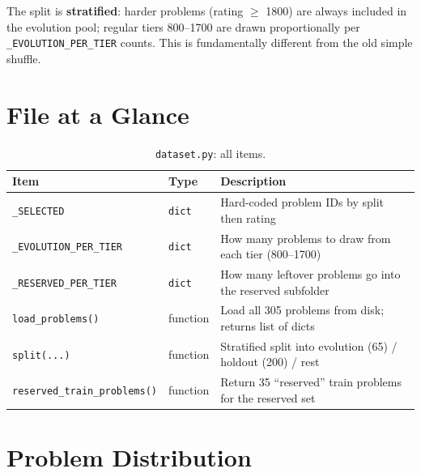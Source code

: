 \documentclass[11pt,a4paper]{report}
\newcommand{\pyfile}[1]{\texttt{#1}}
\newcommand{\fn}[1]{\texttt{#1}}
\begin{document}
The split is \textbf{stratified}: harder problems (rating $\geq$ 1800) are always included
in the evolution pool; regular tiers 800--1700 are drawn proportionally per
\fn{\_EVOLUTION\_PER\_TIER} counts.  This is fundamentally different from the old simple
shuffle.

\section{File at a Glance}

\begin{table}[h]
\centering
\begin{tabular}{@{}llp{7.5cm}@{}}
\toprule
\textbf{Item} & \textbf{Type} & \textbf{Description} \\
\midrule
\fn{\_SELECTED}              & \texttt{dict} & Hard-coded problem IDs by split then rating \\
\fn{\_EVOLUTION\_PER\_TIER}  & \texttt{dict} & How many problems to draw from each tier (800--1700) \\
\fn{\_RESERVED\_PER\_TIER}   & \texttt{dict} & How many leftover problems go into the reserved subfolder \\
\fn{load\_problems()}        & function & Load all 305 problems from disk; returns list of dicts \\
\fn{split(...)}              & function & Stratified split into evolution (65) / holdout (200) / rest \\
\fn{reserved\_train\_problems()} & function & Return 35 ``reserved'' train problems for the reserved set \\
\bottomrule
\end{tabular}
\caption{\pyfile{dataset.py}: all items.}
\end{table}

\section{Problem Distribution}
\end{document}
